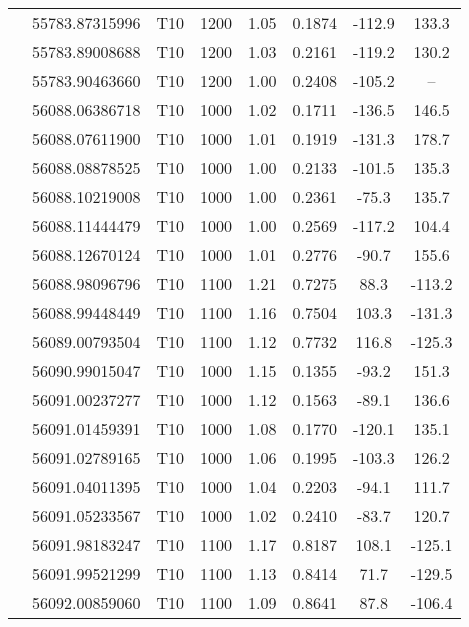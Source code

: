 \documentclass[fleqn,usenatbib]{mnras}
\begin{document}
\begin{center}
\begin{longtable}{lccccccc}
			& 55783.87315996 & T10 & 1200  & 1.05  & 0.1874 & -112.9 & 133.3 \\ %
			& 55783.89008688 & T10 & 1200  & 1.03  & 0.2161 & -119.2 & 130.2 \\ %
			& 55783.90463660 & T10 & 1200  & 1.00  & 0.2408 & -105.2 & -- \\ %
			& 56088.06386718 & T10 & 1000  & 1.02  & 0.1711 & -136.5 & 146.5 \\ %
			& 56088.07611900 & T10 & 1000  & 1.01  & 0.1919 & -131.3 & 178.7 \\ %
			& 56088.08878525 & T10 & 1000  & 1.00  & 0.2133 & -101.5 & 135.3 \\ %
			& 56088.10219008 & T10 & 1000  & 1.00  & 0.2361 & -75.3 & 135.7 \\ %
			& 56088.11444479 & T10 & 1000  & 1.00  & 0.2569 & -117.2 & 104.4 \\ %
			& 56088.12670124 & T10 & 1000  & 1.01  & 0.2776 & -90.7 & 155.6 \\ %
			& 56088.98096796 & T10 & 1100  & 1.21  & 0.7275 & 88.3 & -113.2 \\ %
			& 56088.99448449 & T10 & 1100  & 1.16  & 0.7504 & 103.3 & -131.3 \\ %
			& 56089.00793504 & T10 & 1100  & 1.12  & 0.7732 & 116.8 & -125.3 \\ %
			& 56090.99015047 & T10 & 1000  & 1.15  & 0.1355 & -93.2 & 151.3 \\ %
			& 56091.00237277 & T10 & 1000  & 1.12  & 0.1563 & -89.1 & 136.6 \\ %
			& 56091.01459391 & T10 & 1000  & 1.08  & 0.1770 & -120.1 & 135.1 \\ %
			& 56091.02789165 & T10 & 1000  & 1.06  & 0.1995 & -103.3 & 126.2 \\ %
			& 56091.04011395 & T10 & 1000  & 1.04  & 0.2203 & -94.1 & 111.7 \\ %
			& 56091.05233567 & T10 & 1000  & 1.02  & 0.2410 & -83.7 & 120.7 \\ %
			& 56091.98183247 & T10 & 1100  & 1.17  & 0.8187 & 108.1 & -125.1 \\ %
			& 56091.99521299 & T10 & 1100  & 1.13  & 0.8414 & 71.7 & -129.5 \\ %
			& 56092.00859060 & T10 & 1100  & 1.09  & 0.8641 & 87.8 & -106.4 \\ %

\end{longtable}
\end{center}
\end{document}

